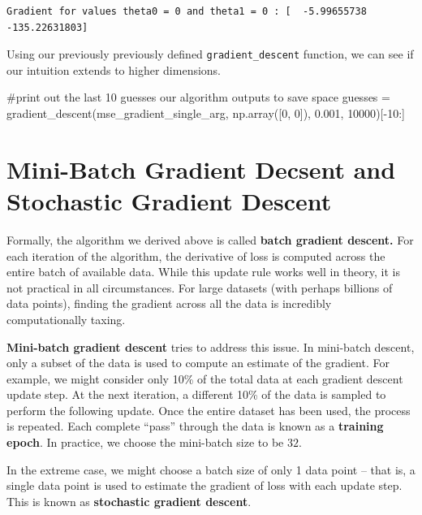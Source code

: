 \documentclass[
  letterpaper,
  DIV=11,
  numbers=noendperiod]{scrreprt}
\newenvironment{Shaded}{\begin{snugshade}}{\end{snugshade}}
\newcommand{\CommentTok}[1]{\textcolor[rgb]{0.37,0.37,0.37}{#1}}
\newcommand{\DecValTok}[1]{\textcolor[rgb]{0.68,0.00,0.00}{#1}}
\newcommand{\FloatTok}[1]{\textcolor[rgb]{0.68,0.00,0.00}{#1}}
\newcommand{\NormalTok}[1]{\textcolor[rgb]{0.00,0.23,0.31}{#1}}
\newcommand{\OperatorTok}[1]{\textcolor[rgb]{0.37,0.37,0.37}{#1}}
\begin{document}
\begin{verbatim}
Gradient for values theta0 = 0 and theta1 = 0 : [  -5.99655738 -135.22631803]
\end{verbatim}

Using our previously previously defined \texttt{gradient\_descent}
function, we can see if our intuition extends to higher dimensions.

\begin{Shaded}
\begin{Highlighting}[]
\CommentTok{\#print out the last 10 guesses our algorithm outputs to save space}
\NormalTok{guesses }\OperatorTok{=}\NormalTok{ gradient\_descent(mse\_gradient\_single\_arg, np.array([}\DecValTok{0}\NormalTok{, }\DecValTok{0}\NormalTok{]), }\FloatTok{0.001}\NormalTok{, }\DecValTok{10000}\NormalTok{)[}\OperatorTok{{-}}\DecValTok{10}\NormalTok{:]}
\end{Highlighting}
\end{Shaded}

\hypertarget{mini-batch-gradient-decsent-and-stochastic-gradient-descent}{%
\section{Mini-Batch Gradient Decsent and Stochastic Gradient
Descent}\label{mini-batch-gradient-decsent-and-stochastic-gradient-descent}}

Formally, the algorithm we derived above is called \textbf{batch
gradient descent.} For each iteration of the algorithm, the derivative
of loss is computed across the entire batch of available data. While
this update rule works well in theory, it is not practical in all
circumstances. For large datasets (with perhaps billions of data
points), finding the gradient across all the data is incredibly
computationally taxing.

\textbf{Mini-batch gradient descent} tries to address this issue. In
mini-batch descent, only a subset of the data is used to compute an
estimate of the gradient. For example, we might consider only 10\% of
the total data at each gradient descent update step. At the next
iteration, a different 10\% of the data is sampled to perform the
following update. Once the entire dataset has been used, the process is
repeated. Each complete ``pass'' through the data is known as a
\textbf{training epoch}. In practice, we choose the mini-batch size to
be \(32\).

In the extreme case, we might choose a batch size of only 1 data point
-- that is, a single data point is used to estimate the gradient of loss
with each update step. This is known as \textbf{stochastic gradient
descent}.
\end{document}
